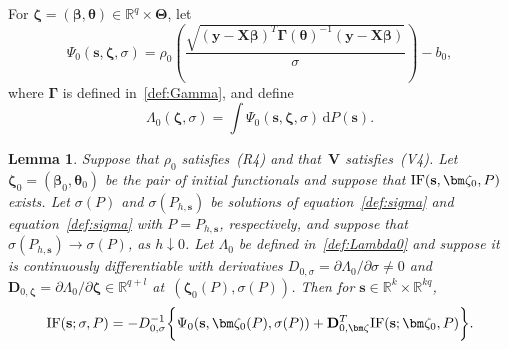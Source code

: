 \documentclass{article}
\numberwithin{equation}{section}
\theoremstyle{plain}
\newtheorem{lemma}{Lemma}
\newcommand{\R}{\mathbb{R}}
\newcommand{\dd}{\mathrm{d}}
\newcommand{\bbeta}{\bm\beta}
\newcommand{\btheta}{\bm\theta}
\newcommand{\bGamma}{\bm\Gamma}
\newcommand{\bTheta}{\bm\Theta}
\newcommand{\bzeta}{\bm\zeta}
\newcommand{\by}{\mathbf{y}}
\newcommand{\bs}{\mathbf{s}}
\newcommand{\bX}{\mathbf{X}}
\newcommand{\bV}{\mathbf{V}}
\newcommand{\bD}{\mathbf{D}}
\begin{document}
For $\bzeta=(\bbeta,\btheta)\in\R^q\times\bTheta$, let
\begin{equation}
\label{def:Psi0}
\Psi_0(\bs,\bzeta,\sigma)
=
\rho_0
\left(
\frac{\displaystyle\sqrt{(\by-\bX\bbeta)^T\bGamma(\btheta)^{-1}(\by-\bX\bbeta)}}{\sigma}
\right)
-
b_0,
\end{equation}
where $\bGamma$ is defined in~\eqref{def:Gamma}, and define
\begin{equation}
\label{def:Lambda0}
\Lambda_0(\bzeta,\sigma)
=
\int \Psi_0(\bs,\bzeta,\sigma)\,\dd P(\bs).
\end{equation}

\begin{lemma}
\label{lem:IF sigma zeta}
Suppose that $\rho_0$ satisfies~(R4) and that~$\bV$ satisfies~(V4).
Let $\bzeta_0=(\bbeta_0,\btheta_0)$ be the pair of initial functionals and suppose that
$\text{\rm IF}(\bs,\bzeta_0,P)$ exists.
Let $\sigma(P)$ and $\sigma(P_{h,\bs})$ be solutions of equation~\eqref{def:sigma} 
and equation~\eqref{def:sigma} with $P=P_{h,\bs}$, respectively,
and suppose that $\sigma(P_{h,\bs})\to\sigma(P)$, as $h\downarrow0$.
Let $\Lambda_0$ be defined in~\eqref{def:Lambda0} and suppose  it is continuously differentiable with derivatives 
$D_{0,\sigma}=\partial\Lambda_0/\partial\sigma\ne0$ 
and $\bD_{0,\bzeta}=\partial\Lambda_0/\partial\bzeta\in\R^{q+l}$ at~$(\bzeta_0(P),\sigma(P))$. 
Then for $\bs\in\R^k\times\R^{kq}$,
\[
\text{\rm IF}(\bs;\sigma,P)
=
-D_{0,\sigma}^{-1}
\bigg\{
\Psi_0(\bs,\bzeta_0(P),\sigma(P))
+
\bD_{0,\bzeta}^T
\text{\rm IF}(\bs;\bzeta_0,P)
\bigg\}.
\]
\end{lemma}
\end{document}
